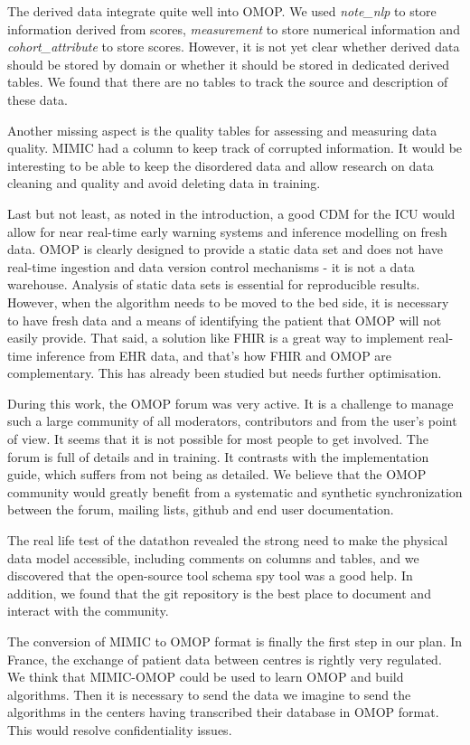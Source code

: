 The derived data integrate quite well into OMOP. We used \textit{note\_nlp} to
store information derived from scores, \textit{measurement} to store numerical
information and \textit{cohort\_attribute} to store scores. However, it is not
yet clear whether derived data should be stored by domain or whether it should
be stored in dedicated derived tables. We found that there are no tables to
track the source and description of these data. 


Another missing aspect is the quality tables for assessing and measuring data 
quality. MIMIC had a column to keep track of corrupted information. 
It would be interesting to be able to keep the disordered data and allow 
research on data cleaning and quality and avoid deleting data in training.

Last but not least, as noted in the introduction, a good CDM for the ICU would 
allow for near real-time early warning systems and inference modelling on fresh 
data. OMOP is clearly designed to provide a static data set and does not have 
real-time ingestion and data version control mechanisms - it is not a data 
warehouse. Analysis of static data sets is essential for reproducible results. 
However, when the algorithm needs to be moved to the bed side, it is necessary 
to have fresh data and a means of identifying the patient that OMOP will not 
easily provide. That said, a solution like FHIR is a great way to implement 
real-time inference from EHR data, and that's how FHIR and OMOP are complementary. 
This has already been studied \cite{gatech}  but needs further optimisation.

During this work, the OMOP forum was very active. It is a challenge to manage 
such a large community of all moderators, contributors and from the user's 
point of view. It seems that it is not possible for most people to get involved. 
The forum is full of details and in training. It contrasts with the implementation 
guide, which suffers from not being as detailed. We believe that the OMOP 
community would greatly benefit from a systematic and synthetic synchronization 
between the forum, mailing lists, github and end user documentation.


The real life test of the datathon revealed the strong need to make the physical 
data model accessible, including comments on columns and tables, and we 
discovered that the open-source tool schema spy tool was a good help. 
In addition, we found that the git repository is the best place to document 
and interact with the community.

The conversion of MIMIC to OMOP format is finally the first step in our plan. 
In France, the exchange of patient data between centres is rightly very regulated. 
We think that MIMIC-OMOP could be used to learn OMOP and build algorithms. 
Then it is necessary to send the data we imagine to send the algorithms in the 
centers having transcribed their database in OMOP format. 
This would resolve confidentiality issues.
